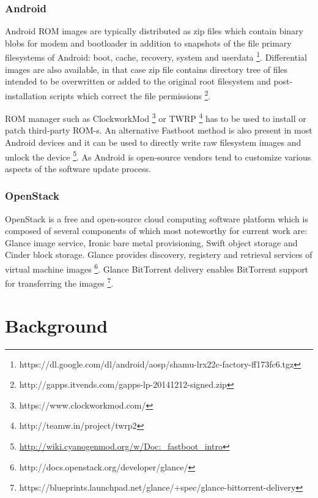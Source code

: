 \documentclass[a4paper,11pt]{kth-mag}
\begin{document}
\subsection{Android}

Android ROM images are typically distributed as zip files which contain 
binary blobs for modem and bootloader in addition to snapshots of the
file primary filesystems of Android: boot, cache, recovery, system and
userdata
\footnote{https://dl.google.com/dl/android/aosp/shamu-lrx22c-factory-ff173fc6.tgz}.
Differential images are also available, in that case zip file contains
directory tree of files intended to be overwritten or added to the original
root filesystem and post-installation scripts which correct the file permissions
\footnote{http://gapps.itvends.com/gapps-lp-20141212-signed.zip}.

ROM manager such as ClockworkMod \footnote{https://www.clockworkmod.com/} or
TWRP \footnote{http://teamw.in/project/twrp2} has to be used to install or patch
third-party ROM-s.
An alternative Fastboot method is also present in most
Android devices and it can be used to directly write raw filesystem images and
unlock the device
\footnote{\url{http://wiki.cyanogenmod.org/w/Doc:_fastboot_intro}}.
As Android is open-source vendors tend to customize various aspects
of the software update process.




\subsection{OpenStack}

OpenStack is a free and open-source cloud computing software platform
which is composed of several components of which most noteworthy for current work are:
Glance image service, Ironic bare metal provisioning,
Swift object storage and Cinder block storage.
Glance provides discovery, registery and retrieval services of virtual machine images
\footnote{http://docs.openstack.org/developer/glance/}.
Glance BitTorrent delivery enables BitTorrent support for transferring the images
\footnote{https://blueprints.launchpad.net/glance/+spec/glance-bittorrent-delivery}.





%
%
%
%
\chapter{Background}
\label{chap:bgr}
\end{document}
